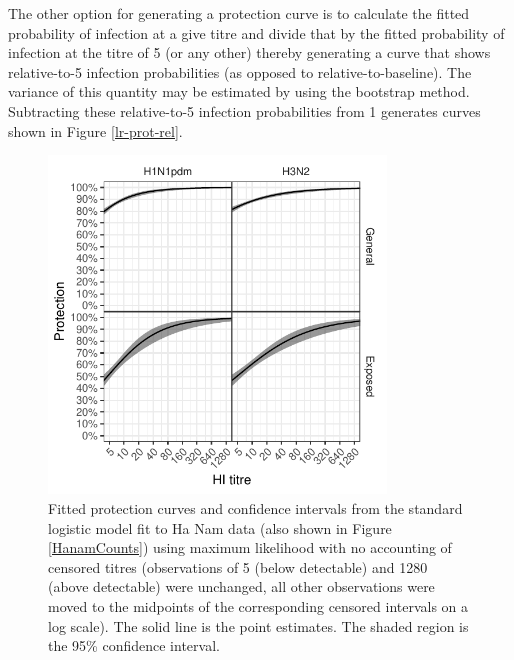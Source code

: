 The other option for generating a protection curve is to calculate the fitted probability of infection at a give titre and divide that by the fitted probability of infection at the titre of 5 (or any other) thereby generating a curve that shows relative-to-5 infection probabilities (as opposed to relative-to-baseline). The variance of this quantity may be estimated by using the bootstrap method. Subtracting these relative-to-5 infection probabilities from 1 generates curves shown in Figure \ref{lr-prot-rel}.

\begin{figure}[htp]
	\centering
	\includegraphics[width=0.8\textwidth]{../fit-logistic-plot/hanam-hi-prot.pdf}
	\caption{
		Fitted protection curves and confidence intervals from the standard logistic model fit to Ha Nam data (also shown in Figure \ref{HanamCounts}) using maximum likelihood with no accounting of censored titres (observations of 5 (below detectable) and 1280 (above detectable) were unchanged, all other observations were moved to the midpoints of the corresponding censored intervals on a log scale). The solid line is the point estimates. The shaded region is the 95\% confidence interval.
	}
	\label{lr-prot-abs}
\end{figure}

